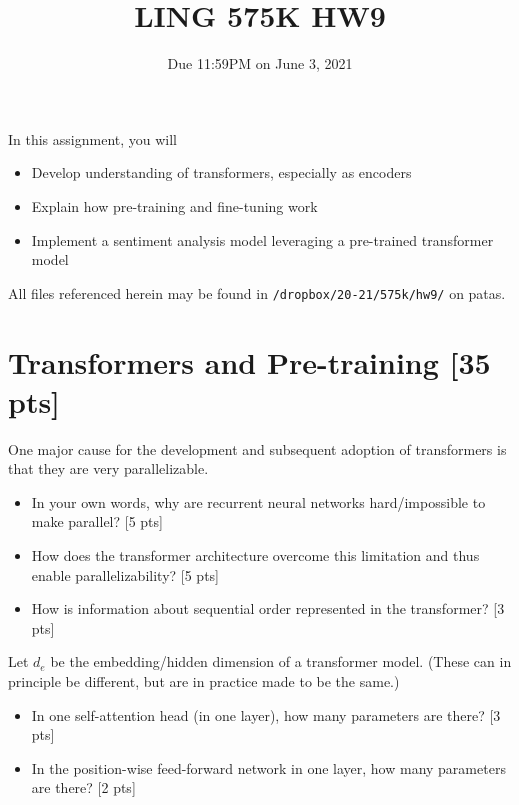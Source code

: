 \documentclass[11pt]{article}
\begin{document}
\title{LING 575K HW9}
\date{\vspace{-0.2in}Due 11:59PM on June 3, 2021}
\maketitle


\noindent In this assignment, you will 
\begin{itemize}
  \item Develop understanding of transformers, especially as encoders
  \item Explain how pre-training and fine-tuning work
  \item Implement a sentiment analysis model leveraging a pre-trained transformer model
\end{itemize}
All files referenced herein may be found in \texttt{/dropbox/20-21/575k/hw9/} on patas.


\section{Transformers and Pre-training [35 pts]}

 One major cause for the development and subsequent adoption of transformers is that they are very parallelizable.
\begin{itemize}
  \item In your own words, why are recurrent neural networks hard/impossible to make parallel? \hfill [5 pts]
  \item How does the transformer architecture overcome this limitation and thus enable parallelizability? \hfill [5 pts]
  \item How is information about sequential order represented in the transformer? \hfill [3 pts]
\end{itemize}

\vspace{2em}
 Let $d_e$ be the embedding/hidden dimension of a transformer model.  (These can in principle be different, but are in practice made to be the same.)
\begin{itemize}
  \item In one self-attention head (in one layer), how many parameters are there? \hfill [3 pts]
  \item In the position-wise feed-forward network in one layer, how many parameters are there? \hfill [2 pts]
\end{itemize}
\end{document}

